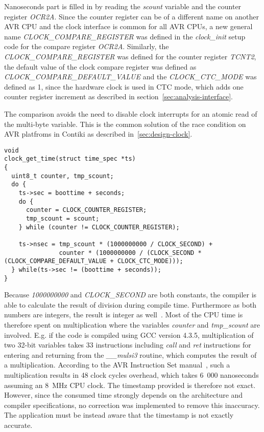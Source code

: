 Nanoseconds part is filled in by reading the {\it{scount}} variable and the counter register {\it{OCR2A}}.
Since the counter register can be of a different name on another AVR CPU
and the clock interface is common for all AVR CPUs,
a new general name {\it{CLOCK\_COMPARE\_REGISTER}} was defined in the {\it{clock\_init}} setup code
for the compare register {\it{OCR2A}}.
Similarly, the {\it{CLOCK\_COMPARE\_REGISTER}} was defined for the counter register {\it{TCNT2}},
the default value of the clock compare register was defined as {\it{CLOCK\_COMPARE\_DEFAULT\_VALUE}}
and the {\it{CLOCK\_CTC\_MODE}} was defined as 1, since the hardware clock is used in CTC mode,
which adds one counter register increment as described in section~\ref{sec:analysis-interface}.

The comparison avoids the need to disable clock interrupts for an atomic
read of the multi-byte variable.
This is the common solution of the race condition
on AVR platfroms in Contiki as described in~\ref{sec:design-clock}.
\begin{lstlisting}
void
clock_get_time(struct time_spec *ts)
{
  uint8_t counter, tmp_scount;
  do {
    ts->sec = boottime + seconds;
    do {
      counter = CLOCK_COUNTER_REGISTER;
      tmp_scount = scount;
    } while (counter != CLOCK_COUNTER_REGISTER);

    ts->nsec = tmp_scount * (1000000000 / CLOCK_SECOND) +
               counter * (1000000000 / (CLOCK_SECOND * (CLOCK_COMPARE_DEFAULT_VALUE + CLOCK_CTC_MODE)));
  } while(ts->sec != (boottime + seconds));
}
\end{lstlisting}
Because {\it{1000000000}} and {\it{CLOCK\_SECOND}} are both constants, the compiler is able to
calculate the result of division during compile time.
Furthermore as both numbers are integers, the result is integer as well~\cite{c99}.
Most of the CPU time is therefore spent on multiplication where the variables
{\it{counter}} and {\it{tmp\_scount}} are involved.
E.g. if the code is compiled using GCC version 4.3.5,
multiplication of two 32-bit variables takes 33 instructions including {\it{call}} and {\it{ret}}
instructions for entering and returning from the {\it{\_\_mulsi3}} routine, which computes
the result of a multiplication.
According to the AVR Instruction Set manual~\cite{avr-instruction-set},
such a multiplication results in 48 clock cycles overhead,
which takes 6~000 nanoseconds assuming an 8~MHz CPU clock.
The timestamp provided is therefore not exact.
However, since the consumed time strongly depends on the architecture and compiler specifications,
no correction was implemented to remove this inaccuracy.
The application must be instead aware that the timestamp is not exactly accurate.

